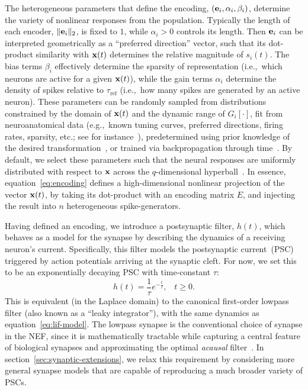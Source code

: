 The heterogeneous parameters that define the encoding, $(\mathbf{e}_i, \alpha_i, \beta_i)$, determine the variety of nonlinear responses from the population.
Typically the length of each encoder, $\| \mathbf{e}_i \|_2$, is fixed to $1$, while $\alpha_i > 0$ controls its length.
Then $\mathbf{e}_i$ can be interpreted geometrically as a ``preferred direction'' vector, such that its dot-product similarity with $\mathbf{x}(t)$ determines the relative magnitude of $s_i(t)$.
The bias terms $\beta_i$ effectively determine the sparsity of representation (i.e.,~which neurons are active for a given $\mathbf{x}(t)$), while the gain terms $\alpha_i$ determine the density of spikes relative to $\tau_\text{ref}$ (i.e.,~how many spikes are generated by an active neuron).
These parameters can be randomly sampled from distributions constrained by the domain of $\mathbf{x}(t)$ and the dynamic range of $G_i \left[ \cdot \right]$, fit from neuroanatomical data (e.g.,~known tuning curves, preferred directions, firing rates, sparsity, etc.; see for instance~\citet{voelker2016a}), predetermined using prior knowledge of the desired transformation~\citep{jgosmann2015}, or trained via backpropagation through time~\citep{rasmussen2018nengodl}.
By default, we select these parameters such that the neural responses are uniformly distributed with respect to $\mathbf{x}$ across the $q$-dimensional hyperball~\citep[][pp.~51--65]{gosmann2018}.
In essence, equation~\ref{eq:encoding} defines a high-dimensional nonlinear projection of the vector $\mathbf{x}(t)$, by taking its dot-product with an encoding matrix $E$, and injecting the result into $n$ heterogeneous spike-generators.

Having defined an encoding, we introduce a postsynaptic filter, $h(t)$, which behaves as a model for the synapse by describing the dynamics of a receiving neuron's current.
Specifically, this filter models the postsynaptic current~(PSC) triggered by action potentials arriving at the synaptic cleft.
For now, we set this to be an exponentially decaying PSC with time-constant $\tau$:
\begin{equation} \label{eq:lowpass-impulse}
h(t) = \frac{1}{\tau} e^{-\frac{t}{\tau}} \text{,} \quad t \ge 0 \text{.}
\end{equation}
This is equivalent (in the Laplace domain) to the canonical first-order lowpass filter (also known as a ``leaky integrator''), with the same dynamics as equation~\ref{eq:lif-model}.
The lowpass synapse is the conventional choice of synapse in the NEF, since it is mathematically tractable while capturing a central feature of biological synapses and approximating the optimal \emph{acausal} filter~\citep[][pp.~109--114,~223]{eliasmith2003a}.
In section~\ref{sec:synaptic-extensions}, we relax this requirement by considering more general synapse models that are capable of reproducing a much broader variety of PSCs.

